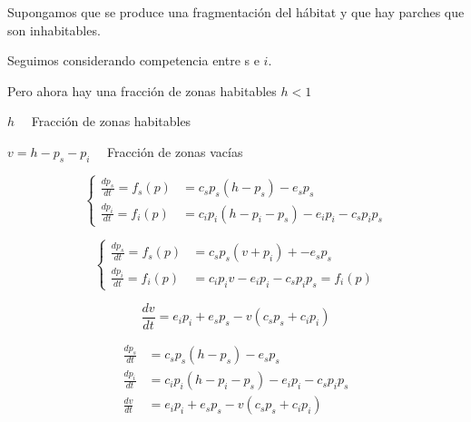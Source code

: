 \documentclass[twocolumn,aps,prl]{revtex4-1}
\begin{document}



Supongamos que se produce una fragmentación del hábitat y que hay parches que son inhabitables. 

Seguimos considerando competencia entre s e $i$. 

Pero ahora hay una fracción de zonas habitables $h<1$ 

$h \quad$ Fracción de zonas habitables 

$v=h-p_{s}-p_{i} \quad$ Fracción de zonas vacías 

$$
\left\{ 
    \begin{aligned}
        \frac{d p_{s}}{d t} = f_{s}(p) &= c_{s} p_{s}\left(h-p_{s}\right)-e_{s} p_{s} \\
        \frac{d p_{i}}{d t} = f_{i}(p) &= c_{i} p_{i}\left(h-p_{i}-p_{s}\right)-e_{i} p_{i}-c_{s} p_{i} p_{s}
    \end{aligned}
\right.
$$

$$
\left\{ 
    \begin{aligned}
        \frac{d p_{s}}{d t} = f_{s}(p) &= c_{s} p_{s}\left(v+p_{i}\right)+-e_{s} p_{s} \\
        \frac{d p_{i}}{d t} = f_{i}(p) &= c_{i} p_{i} v-e_{i} p_{i}-c_{s} p_{i} p_{s}=f_{i}(p)
    \end{aligned}
\right.
$$

$$
\frac{d v}{d t}=e_{i} p_{i}+e_{s} p_{s}-v\left(c_{s} p_{s}+c_{i} p_{i}\right)
$$

$$
\begin{aligned}
    \frac{d p_{s}}{d t} &= c_{s} p_{s}\left(h-p_{s}\right)-e_{s} p_{s} \\
    \frac{d p_{i}}{d t} &= c_{i} p_{i}\left(h-p_{i}-p_{s}\right)-e_{i} p_{i}-c_{s} p_{i} p_{s} \\
    \frac{d     v}{d t} &= e_{i} p_{i}+e_{s} p_{s}-v\left(c_{s} p_{s}+c_{i} p_{i}\right)
\end{aligned}
$$
\end{document}
